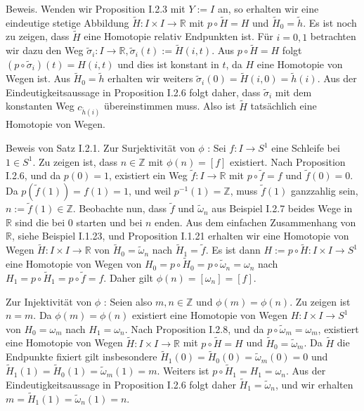 \documentclass[10pt, letterpaper]{article}
\begin{document}
Beweis. Wenden wir Proposition I.2.3 mit $Y:=I$ an, so erhalten wir eine eindeutige stetige Abbildung $\tilde{H}: I \times I \rightarrow \mathbb{R}$ mit $p \circ \tilde{H}=H$ und $\tilde{H}_{0}=\tilde{h}$. Es ist noch zu zeigen, dass $\tilde{H}$ eine Homotopie relativ Endpunkten ist. Für $i=0,1$ betrachten wir dazu den Weg $\tilde{\sigma}_{i}: I \rightarrow \mathbb{R}, \tilde{\sigma}_{i}(t):=\tilde{H}(i, t)$. Aus $p \circ \tilde{H}=H$ folgt $\left(p \circ \tilde{\sigma}_{i}\right)(t)=H(i, t)$ und dies ist konstant in $t$, da $H$ eine Homotopie von Wegen ist. Aus $\tilde{H}_{0}=\tilde{h}$ erhalten wir weiters $\tilde{\sigma}_{i}(0)=\tilde{H}(i, 0)=\tilde{h}(i)$. Aus der Eindeutigkeitsaussage in Proposition I.2.6 folgt daher, dass $\tilde{\sigma}_{i}$ mit dem konstanten Weg $c_{\tilde{h}(i)}$ übereinstimmen muss. Also ist $\tilde{H}$ tatsächlich eine Homotopie von Wegen.

Beweis von Satz I.2.1. Zur Surjektivität von $\phi$ : Sei $f: I \rightarrow S^{1}$ eine Schleife bei $1 \in S^{1}$. Zu zeigen ist, dass $n \in \mathbb{Z}$ mit $\phi(n)=[f]$ existiert. Nach Proposition I.2.6, und da $p(0)=1$, existiert ein Weg $\tilde{f}: I \rightarrow \mathbb{R}$ mit $p \circ \tilde{f}=f$ und $\tilde{f}(0)=0$. Da $p(\tilde{f}(1))=f(1)=1$, und weil $p^{-1}(1)=\mathbb{Z}$, muss $\tilde{f}(1)$ ganzzahlig sein, $n:=\tilde{f}(1) \in \mathbb{Z}$. Beobachte nun, dass $\tilde{f}$ und $\tilde{\omega}_{n}$ aus Beispiel I.2.7 beides Wege in $\mathbb{R}$ sind die bei 0 starten und bei $n$ enden. Aus dem einfachen Zusammenhang von $\mathbb{R}$, siehe Beispiel I.1.23, und Proposition I.1.21 erhalten wir eine Homotopie von Wegen $\tilde{H}: I \times I \rightarrow \mathbb{R}$ von $\tilde{H}_{0}=\tilde{\omega}_{n}$ nach $\tilde{H}_{1}=\tilde{f}$. Es ist dann $H:=p \circ \tilde{H}: I \times I \rightarrow S^{1}$ eine Homotopie von Wegen von $H_{0}=p \circ \tilde{H}_{0}=p \circ \tilde{\omega}_{n}=\omega_{n}$ nach $H_{1}=p \circ \tilde{H}_{1}=p \circ \tilde{f}=f$. Daher gilt $\phi(n)=\left[\omega_{n}\right]=[f]$.

Zur Injektivität von $\phi$ : Seien also $m, n \in \mathbb{Z}$ und $\phi(m)=\phi(n)$. Zu zeigen ist $n=m$. Da $\phi(m)=\phi(n)$ existiert eine Homotopie von Wegen $H: I \times I \rightarrow S^{1}$ von $H_{0}=\omega_{m}$ nach $H_{1}=\omega_{n}$. Nach Proposition I.2.8, und da $p \circ \tilde{\omega}_{m}=\omega_{m}$, existiert eine Homotopie von Wegen $\tilde{H}: I \times I \rightarrow \mathbb{R}$ mit $p \circ \tilde{H}=H$ und $\tilde{H}_{0}=\tilde{\omega}_{m}$. Da $\tilde{H}$ die Endpunkte fixiert gilt insbesondere $\tilde{H}_{1}(0)=\tilde{H}_{0}(0)=\tilde{\omega}_{m}(0)=0$ und $\tilde{H}_{1}(1)=\tilde{H}_{0}(1)=\tilde{\omega}_{m}(1)=m$. Weiters ist $p \circ \tilde{H}_{1}=H_{1}=\omega_{n}$. Aus der Eindeutigkeitsaussage in Proposition I.2.6 folgt daher $\tilde{H}_{1}=\tilde{\omega}_{n}$, und wir erhalten $m=\tilde{H}_{1}(1)=\tilde{\omega}_{n}(1)=n$.
\end{document}
